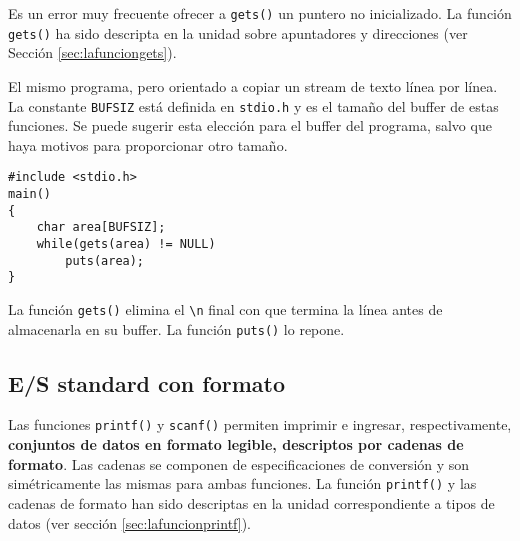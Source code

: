 Es un error muy frecuente ofrecer a \lstinline{gets()} un puntero
no inicializado. La función \lstinline{gets()} ha sido descripta en la unidad sobre
apuntadores y direcciones (ver Sección \ref{sec:lafunciongets}).


\begin{ejemplo}
El mismo programa, pero orientado a copiar un stream de texto línea por línea.
La constante \lstinline{BUFSIZ} está definida en \lstinline{stdio.h} y es el tamaño del buffer de estas
funciones. Se puede sugerir esta elección para el buffer del programa, salvo
que haya motivos para proporcionar otro tamaño.

\begin{lstlisting}
#include <stdio.h>
main()
{
    char area[BUFSIZ];
    while(gets(area) != NULL)
        puts(area);
}
\end{lstlisting}
\end{ejemplo}

La función \lstinline{gets()} elimina el \lstinline{\n} final con que termina la línea antes de
almacenarla en su buffer. La función \lstinline{puts()} lo repone.


\subsection{E/S standard con formato}
\label{subsec:esstandardformato}
Las funciones \lstinline{printf()} y \lstinline{scanf()} permiten imprimir e ingresar, respectivamente,
\textbf{conjuntos de datos en formato legible, descriptos por cadenas de formato}. Las
cadenas se componen de especificaciones de conversión y son simétricamente las
mismas para ambas funciones. La función \lstinline{printf()} y las cadenas de formato han
sido descriptas en la unidad correspondiente a tipos de datos (ver sección \ref{sec:lafuncionprintf}).

